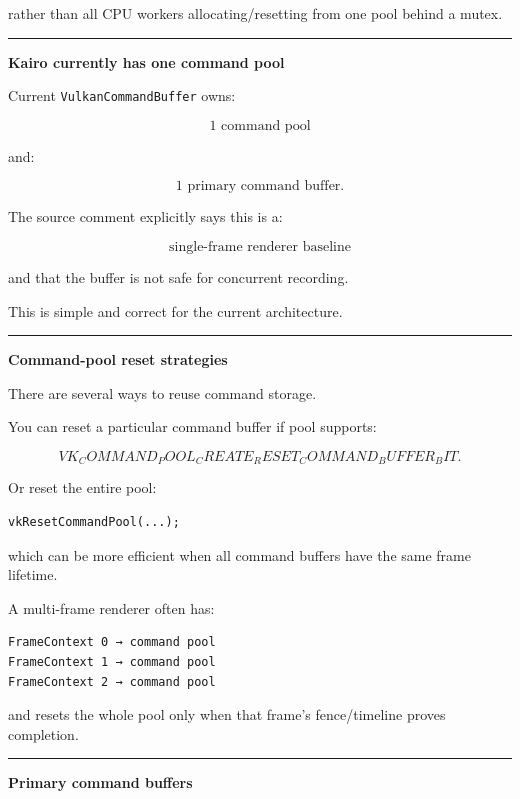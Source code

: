 rather than all CPU workers allocating/resetting from one pool behind a mutex.

\begin{center}\rule{0.5\linewidth}{0.5pt}\end{center}

\textbf{Kairo currently has one command pool}

Current \texttt{VulkanCommandBuffer} owns:

\[
1\text{ command pool}
\]

and:

\[
1\text{ primary command buffer}.
\]

The source comment explicitly says this is a:

\[
\boxed{\text{single-frame renderer baseline}}
\]

and that the buffer is not safe for concurrent recording.

This is simple and correct for the current architecture.

\begin{center}\rule{0.5\linewidth}{0.5pt}\end{center}

\textbf{Command-pool reset strategies}

There are several ways to reuse command storage.

You can reset a particular command buffer if pool supports:

\[
VK_COMMAND_POOL_CREATE_RESET_COMMAND_BUFFER_BIT.
\]

Or reset the entire pool:

\begin{verbatim}
vkResetCommandPool(...);
\end{verbatim}

which can be more efficient when all command buffers have the same frame lifetime.

A multi-frame renderer often has:

\begin{verbatim}
FrameContext 0 → command pool
FrameContext 1 → command pool
FrameContext 2 → command pool
\end{verbatim}

and resets the whole pool only when that frame's fence/timeline proves completion.

\begin{center}\rule{0.5\linewidth}{0.5pt}\end{center}

\textbf{Primary command buffers}

